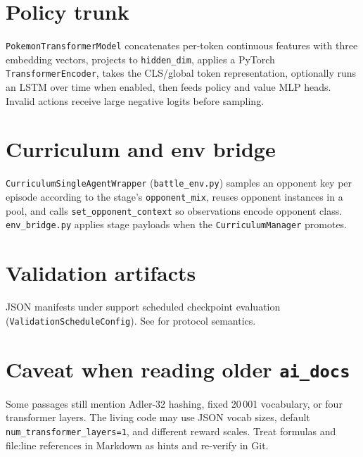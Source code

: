 \section{Policy trunk}
\texttt{PokemonTransformerModel} concatenates per-token continuous features with three embedding vectors, projects to \texttt{hidden\_dim}, applies a PyTorch \texttt{TransformerEncoder}, takes the CLS/global token representation, optionally runs an LSTM over time when enabled, then feeds policy and value MLP heads. Invalid actions receive large negative logits before sampling.

\section{Curriculum and env bridge}
\texttt{CurriculumSingleAgentWrapper} (\texttt{battle\_env.py}) samples an opponent key per episode according to the stage's \texttt{opponent\_mix}, reuses opponent instances in a pool, and calls \texttt{set\_opponent\_context} so observations encode opponent class. \texttt{env\_bridge.py} applies stage payloads when the \texttt{CurriculumManager} promotes.

\section{Validation artifacts}
JSON manifests under  support scheduled checkpoint evaluation (\texttt{Validation\-Schedule\-Config}). See  for protocol semantics.

\section{Caveat when reading older \texttt{ai\_docs}}
Some passages still mention Adler-32 hashing, fixed 20\,001 vocabulary, or four transformer layers. The living code may use JSON vocab sizes, default \texttt{num\_transformer\_layers=1}, and different reward scales. Treat formulas and file:line references in Markdown as hints and re-verify in Git.
